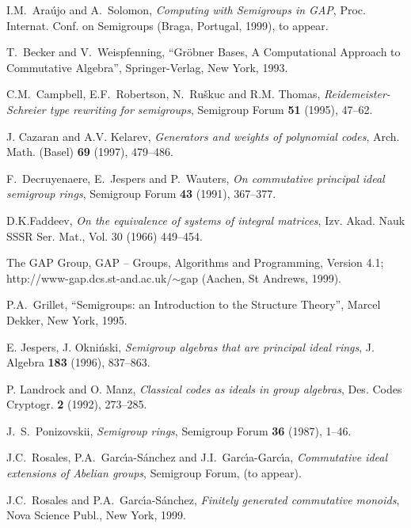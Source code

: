 \documentclass[12pt]{article}
\def\gap{\sf GAP}
\begin{document}
\begin{thebibliography}{9}

I.M.~Ara\'ujo and A.~Solomon, 
{\em Computing with Semigroups in GAP},
Proc. Internat. Conf. on Semigroups (Braga, 
Portugal, 1999), to appear.

T.~Becker and V.~Weispfenning, 
{``Gr\"{o}bner Bases, A Computational Approach 
to Commutative Algebra''}, 
Springer-Verlag, New York, 1993.

C.M.~Campbell, E.F.~Robertson, N.~Ru\v{s}kuc and  R.M. Thomas,
{\it Reidemeister-Schreier type rewriting for semigroups},
Semigroup Forum {\bf 51} (1995), 47--62.

J. Cazaran and A.V. Kelarev,
{\it Generators and weights of polynomial codes},
Arch. Math. (Basel) {\bf 69} (1997), 479--486.

F.~Decruyenaere, E.~Jespers and P.~Wauters, 
{\it On commutative principal ideal semigroup rings},
Semigroup Forum {\bf 43} (1991), 367--377.

D.K.Faddeev,  
\emph{On the equivalence of systems of integral matrices},
Izv. Akad. Nauk SSSR Ser. Mat., Vol. 30 (1966) 449--454. 

The GAP Group, {\gap} -- Groups, Algorithms and Programming,
Version 4.1; http://www-gap.dcs.st-and.ac.uk/$\sim$gap (Aachen, St Andrews,
1999).

P.A.~Grillet,
{``Semigroups: an Introduction to the Structure Theory''},
Marcel Dekker, New York, 1995.

E. Jespers, J. Okni\'{n}ski, 
{\it Semigroup algebras that are principal ideal rings}, 
J. Algebra {\bf 183} (1996), 837--863.

P. Landrock and  O. Manz,
{\it Classical codes as ideals in group algebras},
Des. Codes Cryptogr. {\bf 2} (1992), 273--285.

J.~S.~Ponizovskii, 
{\it Semigroup rings}, 
Semigroup Forum {\bf 36} (1987), 1--46.

J.C.~Rosales, P.A.~Garc\'{\i}a-S\'{a}nchez and 
J.I.~Garc\'{\i}a-Garc\'{\i}a,
\emph{Commutative ideal extensions of Abelian groups},
Semigroup Forum, (to appear).

J.C.~Rosales and  P.A.~Garc\'{\i}a-S\'{a}nchez,
{\it Finitely generated commutative monoids}, 
Nova Science Publ., New York, 1999.


\end{thebibliography}
\end{document}
